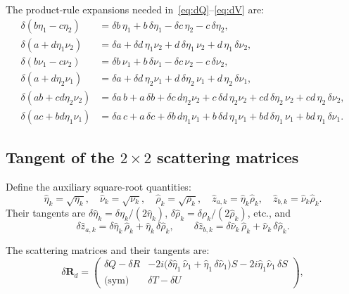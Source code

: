 \documentclass[11pt,a4paper]{article}
\newcommand{\dR}{\delta\mathbf{R}}
\theoremstyle{plain}
\theoremstyle{remark}
\begin{document}
The product-rule expansions needed in~\eqref{eq:dQ}--\eqref{eq:dV} are:
\begin{align}
  \delta(b\eta_1 - c\eta_2) &= \delta b\,\eta_1 + b\,\delta\eta_1
                              - \delta c\,\eta_2 - c\,\delta\eta_2,
  \label{eq:d-bec}\\
  \delta(a + d\eta_1\nu_2) &= \delta a + \delta d\,\eta_1\nu_2
                             + d\,\delta\eta_1\,\nu_2 + d\,\eta_1\,\delta\nu_2,
  \label{eq:d-adn}\\
  \delta(b\nu_1 - c\nu_2) &= \delta b\,\nu_1 + b\,\delta\nu_1
                            - \delta c\,\nu_2 - c\,\delta\nu_2,
  \label{eq:d-bnc}\\
  \delta(a + d\eta_2\nu_1) &= \delta a + \delta d\,\eta_2\nu_1
                             + d\,\delta\eta_2\,\nu_1 + d\,\eta_2\,\delta\nu_1,
  \label{eq:d-adn2}\\
  \delta(ab + cd\eta_2\nu_2) &= \delta a\,b + a\,\delta b
    + \delta c\,d\eta_2\nu_2 + c\,\delta d\,\eta_2\nu_2
    + cd\,\delta\eta_2\,\nu_2 + cd\,\eta_2\,\delta\nu_2,
  \label{eq:d-abcd}\\
  \delta(ac + bd\eta_1\nu_1) &= \delta a\,c + a\,\delta c
    + \delta b\,d\eta_1\nu_1 + b\,\delta d\,\eta_1\nu_1
    + bd\,\delta\eta_1\,\nu_1 + bd\,\eta_1\,\delta\nu_1.
  \label{eq:d-acbd}
\end{align}

\subsection{Tangent of the $2\times 2$ scattering matrices}\label{sec:tl-scatmat}

Define the auxiliary square-root quantities:
\begin{equation}\label{eq:sqrts}
  \hat\eta_k = \sqrt{\eta_k},\quad
  \hat\nu_k = \sqrt{\nu_k},\quad
  \hat\rho_k = \sqrt{\rho_k},\quad
  \hat{z}_{a,k} = \hat\eta_k\hat\rho_k,\quad
  \hat{z}_{b,k} = \hat\nu_k\hat\rho_k.
\end{equation}
Their tangents are $\delta\hat\eta_k = \delta\eta_k/(2\hat\eta_k)$,\;
$\delta\hat\rho_k = \delta\rho_k/(2\hat\rho_k)$, etc., and
\begin{equation}\label{eq:dz}
  \delta\hat{z}_{a,k}
  = \delta\hat\eta_k\,\hat\rho_k + \hat\eta_k\,\delta\hat\rho_k,
  \qquad
  \delta\hat{z}_{b,k}
  = \delta\hat\nu_k\,\hat\rho_k + \hat\nu_k\,\delta\hat\rho_k.
\end{equation}

The scattering matrices and their tangents are:
\begin{equation}\label{eq:dRd}
  \dR_d = \begin{pmatrix}
    \delta Q - \delta R
    & -2i\bigl(\delta\hat\eta_1\,\hat\nu_1 + \hat\eta_1\,\delta\hat\nu_1\bigr)S
      - 2i\hat\eta_1\hat\nu_1\,\delta S \\[4pt]
    \text{(sym)}
    & \delta T - \delta U
  \end{pmatrix},
\end{equation}
\end{document}
